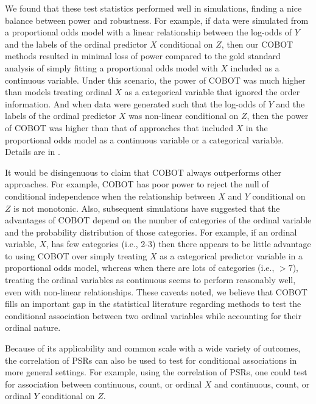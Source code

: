 \documentclass[12pt, usenatbib]{article}
\begin{document}
We found that these test statistics performed well in simulations, finding a nice balance between power and robustness.  For example, if data were simulated from a proportional odds model with a linear relationship between the log-odds of $Y$ and the labels of the ordinal predictor $X$ conditional on $Z$, then our COBOT methods resulted in minimal loss of power compared to the gold standard analysis of simply fitting a proportional odds model with $X$ included as a continuous variable.  Under this scenario, the power of COBOT was much higher than models treating ordinal $X$ as a categorical variable that ignored the order information.  And when data were generated such that the log-odds of $Y$ and the labels of the ordinal predictor $X$ was non-linear conditional on $Z$, then the power of COBOT was higher than that of approaches that included $X$ in the proportional odds model as a continuous variable or a categorical variable.  Details are in \cite{li2010test}.

It would be disingenuous to claim that COBOT always outperforms other approaches.  For example, COBOT has poor power to reject the null of conditional independence when the relationship between $X$ and $Y$ conditional on $Z$ is not monotonic.  Also, subsequent simulations have suggested that the advantages of COBOT depend on the number of categories of the ordinal variable and the probability distribution of those categories.  For example, if an ordinal variable, $X$, has few categories (i.e., 2-3) then there appears to be little advantage to using COBOT over simply treating $X$ as a categorical predictor variable in a proportional odds model, whereas when there are lots of categories (i.e., $>7$), treating the ordinal variables as continuous seems to perform reasonably well, even with non-linear relationships.  These caveats noted, we believe that COBOT fills an important gap in the statistical literature regarding methods to test the conditional association between two ordinal variables while accounting for their ordinal nature.

Because of its applicability and common scale with a wide variety of outcomes, the correlation of PSRs can also be used to test for conditional associations in more general settings.  For example, using the correlation of PSRs, one could test for association between continuous, count, or ordinal $X$ and continuous, count, or ordinal $Y$ conditional on $Z$.   %
\end{document}
